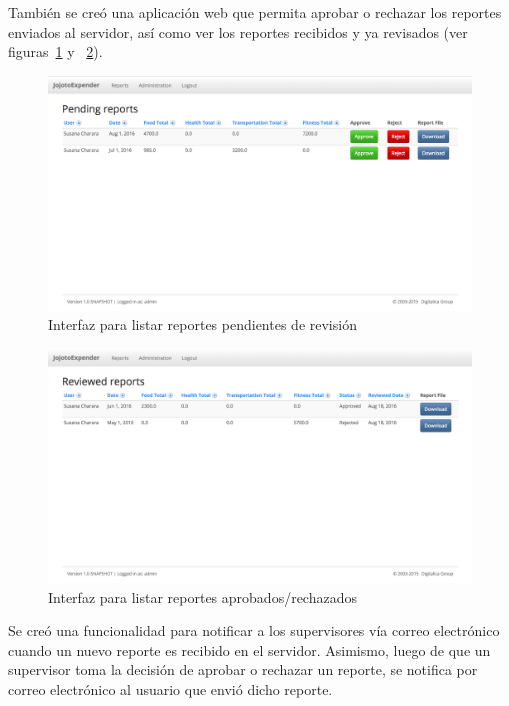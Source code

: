 También se creó una aplicación web que permita aprobar o rechazar los reportes enviados al servidor, así como ver los reportes recibidos y ya revisados (ver figuras~\ref{fig:interfazListarReportesPendientes} y ~\ref{fig:interfazListarReportesRevisados}). 

\begin{figure}[ht]
  \centering
  \includegraphics[scale=0.38,type=png,ext=.png,read=.png]{imagenes/pending_reports}
  \captionsetup{justification=centering}
  \caption{Interfaz para listar reportes pendientes de revisión}
  \label{fig:interfazListarReportesPendientes}
\end{figure}

\begin{figure}[h]
  \centering
  \includegraphics[scale=0.38,type=png,ext=.png,read=.png]{imagenes/reviewed_reports}
  \captionsetup{justification=centering}
  \caption{Interfaz para listar reportes aprobados/rechazados}
  \label{fig:interfazListarReportesRevisados}
\end{figure}


Se creó una funcionalidad para notificar a los supervisores vía correo electrónico cuando un nuevo reporte es recibido en el servidor. Asimismo, luego de que un supervisor toma la decisión de aprobar o rechazar un reporte, se notifica por correo electrónico al usuario que envió dicho reporte.

